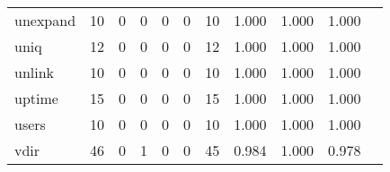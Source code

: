 \begin{longtable}{lp{1.2cm}p{1.2cm}p{1.2cm}p{1.2cm}p{1.2cm}p{1.2cm}p{1.2cm}p{1.2cm}p{1.2cm}p{1.2cm}}
unexpand  &                                    10 &                                                  0 &                                                  0 &                                                  0 &                                                  0 &                                                 10 &                                              1.000 &                                              1.000 &                                              1.000 \\
uniq      &                                    12 &                                                  0 &                                                  0 &                                                  0 &                                                  0 &                                                 12 &                                              1.000 &                                              1.000 &                                              1.000 \\
unlink    &                                    10 &                                                  0 &                                                  0 &                                                  0 &                                                  0 &                                                 10 &                                              1.000 &                                              1.000 &                                              1.000 \\
uptime    &                                    15 &                                                  0 &                                                  0 &                                                  0 &                                                  0 &                                                 15 &                                              1.000 &                                              1.000 &                                              1.000 \\
users     &                                    10 &                                                  0 &                                                  0 &                                                  0 &                                                  0 &                                                 10 &                                              1.000 &                                              1.000 &                                              1.000 \\
vdir      &                                    46 &                                                  0 &                                                  1 &                                                  0 &                                                  0 &                                                 45 &                                              0.984 &                                              1.000 &                                              0.978 \\

\end{longtable}

